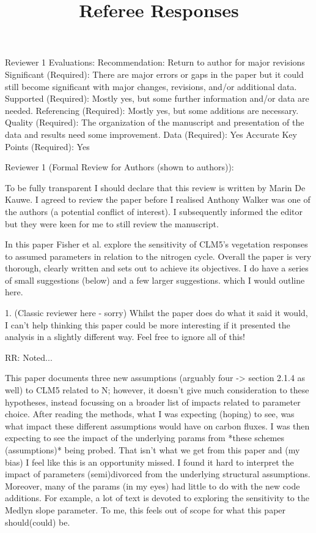 \documentclass{article}
\begin{document}
\title{Referee Responses}

Reviewer 1 Evaluations: 
Recommendation: Return to author for major revisions 
Significant (Required): There are major errors or gaps in the paper but it could still become significant with major changes, revisions, and/or additional data. 
Supported (Required): Mostly yes, but some further information and/or data are needed. 
Referencing (Required): Mostly yes, but some additions are necessary. 
Quality (Required): The organization of the manuscript and presentation of the data and results need some improvement. 
Data (Required): Yes 
Accurate Key Points (Required): Yes 

Reviewer 1 (Formal Review for Authors (shown to authors)): 

To be fully transparent I should declare that this review is written by Marin De Kauwe. I agreed to review the paper before I realised Anthony Walker was one of the authors (a potential conflict of interest). I subsequently informed the editor but they were keen for me to still review the manuscript. 


In this paper Fisher et al. explore the sensitivity of CLM5's vegetation responses to assumed parameters in relation to the nitrogen cycle. Overall the paper is very thorough, clearly written and sets out to achieve its objectives. I do have a series of small suggestions (below) and a few larger suggestions. which I would outline here. 

1. (Classic reviewer here - sorry) Whilst the paper does do what it said it would, I can't help thinking this paper could be more interesting if it presented the analysis in a slightly different way. Feel free to ignore all of this! 

RR: Noted...

This paper documents three new assumptions (arguably four -> section 2.1.4 as well) to CLM5 related to N; however, it doesn't give much consideration to these hypotheses, instead focussing on a broader list of impacts related to parameter choice. After reading the methods, what I was expecting (hoping) to see, was what impact these different assumptions would have on carbon fluxes. I was then expecting to see the impact of the underlying params from *these schemes (assumptions)* being probed. That isn't what we get from this paper and (my bias) I feel like this is an opportunity missed. I found it hard to interpret the impact of parameters (semi)divorced from the underlying structural assumptions. Moreover, many of the params (in my eyes) had little to do with the new code additions. For example, a lot of text is devoted to exploring the sensitivity to the Medlyn slope parameter. To me, this feels out of scope for what this paper should(could) be. 
\end{document}
